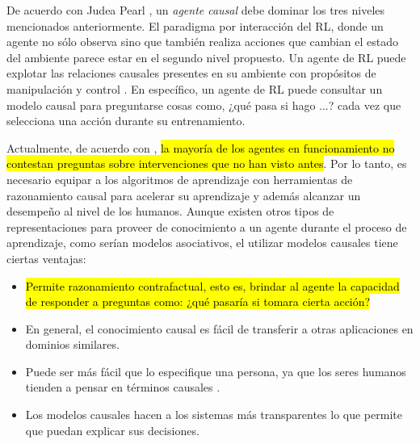 De acuerdo con Judea Pearl \cite{pearl2018bookofwhy}, 
un \textit{agente causal} debe dominar los tres niveles mencionados anteriormente.
El paradigma por interacción del RL, donde un agente
no sólo observa sino que también realiza acciones que 
cambian el estado del ambiente parece estar 
en el segundo nivel propuesto.
Un agente de RL puede explotar las relaciones causales presentes
en su ambiente con propósitos de manipulación y control \cite{woodward2005making}.
En específico, un agente de RL puede consultar un modelo
causal para preguntarse cosas como, ¿qué pasa si hago ...?
cada vez que selecciona una acción durante su entrenamiento.


Actualmente, de acuerdo con \cite{pearl2018theoretical}, \hl{ la mayoría de los agentes en funcionamiento no contestan preguntas sobre intervenciones que no han visto antes}. 
Por lo tanto, es necesario equipar a
los algoritmos de aprendizaje con herramientas de razonamiento
causal para acelerar su aprendizaje y además alcanzar 
un desempeño al nivel de los humanos.
Aunque existen otros tipos de representaciones para proveer de
conocimiento a un agente durante el proceso de aprendizaje, como serían
modelos asociativos, el utilizar modelos causales tiene ciertas
ventajas:

\begin{itemize}

\item \hl{Permite razonamiento contrafactual, esto es, brindar al agente la
capacidad de responder a preguntas como: ¿qué pasaría si tomara cierta
acción?} 
\item En general, 
el conocimiento causal es fácil de 
transferir a otras aplicaciones en dominios similares.
\item Puede ser más fácil que lo especifique una persona, ya que los seres humanos tienden a pensar en términos causales \cite{edmonds2018human, Gershman2017}.
\item Los modelos causales hacen a los sistemas más transparentes lo que permite que puedan explicar sus
decisiones.
\end{itemize}

